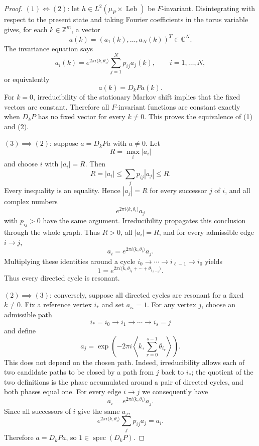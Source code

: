 \documentclass[11pt,a4paper]{amsart}
\newcommand{\C}{\mathbb C}
\newcommand{\Z}{\mathbb Z}
\newcommand{\Leb}{\operatorname{Leb}}
\begin{document}
\begin{proof}

\smallskip
\noindent $(1) \iff (2)$:
let \(h\in L^2(\mu_P\times\Leb)\) be \(F\)-invariant.  Disintegrating
with respect to the present state and taking Fourier coefficients in
the torus variable gives, for each \(k\in\Z^m\), a vector
\[
 a(k)=(a_1(k),\ldots,a_N(k))^T\in\C^N.
\]
The invariance equation says
\[
 a_i(k)
 =e^{2\pi i\langle k,\theta_i\rangle}
   \sum_{j=1}^Np_{ij}a_j(k),
 \qquad i=1,\ldots,N,
\]
or equivalently
\[
 a(k)=D_kPa(k).
\]
For \(k=0\), irreducibility of the stationary Markov shift implies
that the fixed vectors are constant.  Therefore all \(F\)-invariant
functions are constant exactly when \(D_kP\) has no fixed vector for
every \(k\ne0\).  This proves the equivalence of (1) and (2).

\smallskip
\noindent $(3) \implies (2)$:
suppose \(a=D_kPa\) with \(a\ne0\).  Let
\[
 R=\max_i|a_i|
\]
and choose \(i\) with \(|a_i|=R\).  Then
\[
 R=|a_i|
 \le\sum_jp_{ij}|a_j|\le R.
\]
Every inequality is an equality.  Hence \(|a_j|=R\) for every
successor \(j\) of \(i\), and all complex numbers
\[
 e^{2\pi i\langle k,\theta_i\rangle}a_j
\]
with \(p_{ij}>0\) have the same argument.  Irreducibility propagates
this conclusion through the whole graph.  Thus \(R>0\), all
\(|a_i|=R\), and for every admissible edge \(i\to j\),
\[
 a_i=e^{2\pi i\langle k,\theta_i\rangle}a_j.
\]
Multiplying these identities around a cycle
\(i_0\to\cdots\to i_{\ell-1}\to i_0\) yields
\[
 1=
 e^{2\pi i\langle k,\theta_{i_0}+\cdots+\theta_{i_{\ell-1}}\rangle}.
\]
Thus every directed cycle is resonant.

\smallskip
\noindent $(2) \implies (3)$:
conversely, suppose all directed cycles are resonant for a fixed
\(k\ne0\).  Fix a reference vertex \(i_*\) and set \(a_{i_*}=1\).
For any vertex \(j\), choose an admissible path
\[
 i_*=i_0\to i_1\to\cdots\to i_s=j
\]
and define
\[
 a_j=
 \exp\left(
 -2\pi i\left\langle k,
 \sum_{r=0}^{s-1}\theta_{i_r}\right\rangle
 \right).
\]
This does not depend on the chosen path.  Indeed, irreducibility
allows each of two candidate paths to be closed by a path from \(j\)
back to \(i_*\); the quotient of the two definitions is the phase
accumulated around a pair of directed cycles, and both phases equal
one.  For every edge \(i\to j\) we consequently have
\[
 a_i=e^{2\pi i\langle k,\theta_i\rangle}a_j.
\]
Since all successors of \(i\) give the same \(a_j\),
\[
 e^{2\pi i\langle k,\theta_i\rangle}
 \sum_jp_{ij}a_j=a_i.
\]
Therefore \(a=D_kPa\), so \(1\in\operatorname{spec}(D_kP)\).
\end{proof}
\end{document}
